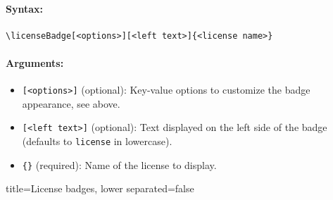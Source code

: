 \paragraph{Syntax:}
\begin{verbatim}
\licenseBadge[<options>][<left text>]{<license name>}
\end{verbatim}

\paragraph{Arguments:}
\begin{itemize}
    \item \texttt{[<options>]} (optional): Key-value options to customize the badge appearance, see above.
    \item \texttt{[<left text>]} (optional): Text displayed on the left side of the badge (defaults to \texttt{license} in lowercase).
    \item \texttt{\{<license name>\}} (required): Name of the license to display.
\end{itemize}


\begin{tcblisting}{title={License badges}, lower separated=false}
\end{tcblisting}

